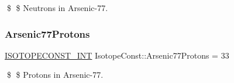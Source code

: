 \$ \$ Neutrons in Arsenic-\/77. \mbox{\label{group___isotope_const-_arsenic-_as77_ga42cc3ee76ec991dc0d4be12911e228a4}} 
\subsubsection{\texorpdfstring{Arsenic77\+Protons}{Arsenic77Protons}}
{\footnotesize\ttfamily \mbox{\hyperlink{group___isotope_const-_macros_ga5f18360b3e99483a35c32d789e62621c}{I\+S\+O\+T\+O\+P\+E\+C\+O\+N\+S\+T\+\_\+\+I\+NT}} Isotope\+Const\+::\+Arsenic77\+Protons = 33}

\$ \$ Protons in Arsenic-\/77. 
